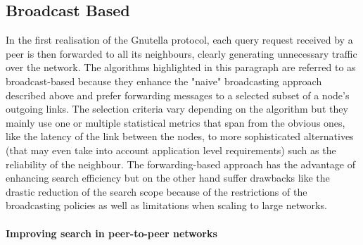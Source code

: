 \subsection{Broadcast Based}

In the first realisation of the Gnutella protocol, each query request received
by a peer is then forwarded to all its neighbours, clearly generating
unnecessary traffic over the network. The algorithms highlighted in this
paragraph are referred to as broadcast-based because they enhance the "naive"
broadcasting approach described above and prefer forwarding messages to a
selected subset of a node's outgoing links. The selection criteria vary
depending on the algorithm but they mainly use one or multiple statistical
metrics that span from the obvious ones, like the latency of the link between
the nodes, to more sophisticated alternatives (that may even take into account
application level requirements) such as the reliability of the neighbour. The
forwarding-based approach has the advantage of enhancing search efficiency but
on the other hand suffer drawbacks like the drastic reduction of the search
scope because of the restrictions of the broadcasting policies as well as
limitations when scaling to large networks.


\paragraph*{\bf Improving search in peer-to-peer networks}

